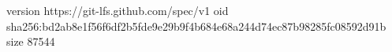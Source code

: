 version https://git-lfs.github.com/spec/v1
oid sha256:bd2ab8e1f56f6df2b5fde9e29b9f4b684e68a244d74ec87b98285fc08592d91b
size 87544

